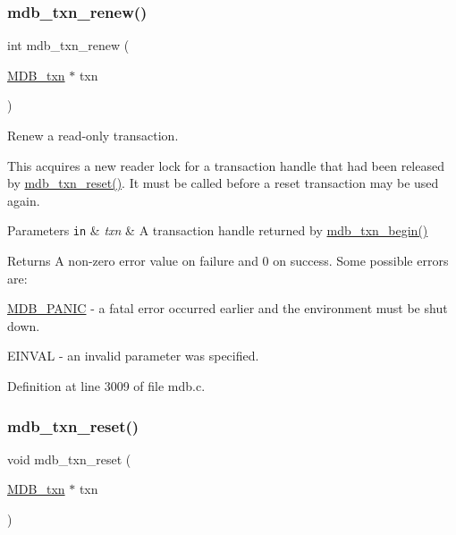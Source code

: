 \subsubsection{\texorpdfstring{mdb\+\_\+txn\+\_\+renew()}{mdb\_txn\_renew()}}
{\footnotesize\ttfamily int mdb\+\_\+txn\+\_\+renew (\begin{DoxyParamCaption}\item[{\mbox{\hyperlink{struct_m_d_b__txn}{M\+D\+B\+\_\+txn}} $\ast$}]{txn }\end{DoxyParamCaption})}



Renew a read-\/only transaction. 

This acquires a new reader lock for a transaction handle that had been released by \mbox{\hyperlink{group__mdb_ga02b06706f8a66249769503c4e88c56cd}{mdb\+\_\+txn\+\_\+reset()}}. It must be called before a reset transaction may be used again. 
\begin{DoxyParams}[1]{Parameters}
\mbox{\tt in}  & {\em txn} & A transaction handle returned by \mbox{\hyperlink{group__mdb_gad7ea55da06b77513609efebd44b26920}{mdb\+\_\+txn\+\_\+begin()}} \\
\hline
\end{DoxyParams}
\begin{DoxyReturn}{Returns}
A non-\/zero error value on failure and 0 on success. Some possible errors are\+: 
\begin{DoxyItemize}
\item \mbox{\hyperlink{group__errors_gae37b9aedcb3767faba3de8c1cf6d3473}{M\+D\+B\+\_\+\+P\+A\+N\+IC}} -\/ a fatal error occurred earlier and the environment must be shut down. 
\item E\+I\+N\+V\+AL -\/ an invalid parameter was specified. 
\end{DoxyItemize}
\end{DoxyReturn}


Definition at line 3009 of file mdb.\+c.

\mbox{\label{group__internal_ga02b06706f8a66249769503c4e88c56cd}} 
\subsubsection{\texorpdfstring{mdb\+\_\+txn\+\_\+reset()}{mdb\_txn\_reset()}}
{\footnotesize\ttfamily void mdb\+\_\+txn\+\_\+reset (\begin{DoxyParamCaption}\item[{\mbox{\hyperlink{struct_m_d_b__txn}{M\+D\+B\+\_\+txn}} $\ast$}]{txn }\end{DoxyParamCaption})}



